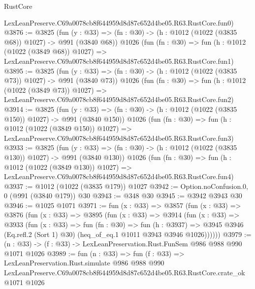 \begin{lexlean}{RustCore}
\begin{coremodule}
    LexLeanPreserve.C69a0078cb8f644959d8d87c652d4be05.R63.RustCore.fun0)
@3876 := @3825
    (fun (y : @33) => (fn : @30) -> (h : @1012 (@1022 (@3835 @68)) @1027) -> @991 (@3840 @68))
    @1026
    (fun (fn : @30) =>
    fun (h : @1012 (@1022 (@3849 @68)) @1027) =>
    LexLeanPreserve.C69a0078cb8f644959d8d87c652d4be05.R63.RustCore.fun1)
@3895 := @3825
    (fun (y : @33) => (fn : @30) -> (h : @1012 (@1022 (@3835 @73)) @1027) -> @991 (@3840 @73))
    @1026
    (fun (fn : @30) =>
    fun (h : @1012 (@1022 (@3849 @73)) @1027) =>
    LexLeanPreserve.C69a0078cb8f644959d8d87c652d4be05.R63.RustCore.fun2)
@3914 := @3825
    (fun (y : @33) => (fn : @30) -> (h : @1012 (@1022 (@3835 @150)) @1027) -> @991 (@3840 @150))
    @1026
    (fun (fn : @30) =>
    fun (h : @1012 (@1022 (@3849 @150)) @1027) =>
    LexLeanPreserve.C69a0078cb8f644959d8d87c652d4be05.R63.RustCore.fun3)
@3933 := @3825
    (fun (y : @33) => (fn : @30) -> (h : @1012 (@1022 (@3835 @130)) @1027) -> @991 (@3840 @130))
    @1026
    (fun (fn : @30) =>
    fun (h : @1012 (@1022 (@3849 @130)) @1027) =>
    LexLeanPreserve.C69a0078cb8f644959d8d87c652d4be05.R63.RustCore.fun4)
@3937 := @1012 (@1022 (@3835 @179)) @1027
@3942 := Option.noConfusion.{0, 0} (@991 (@3840 @179)) @30
@3943 := @348 @30
@3945 := @3942 @3943 @30
@3946 := @1025 @1071
@3971 := fun (x : @33) =>
  @3857
    (fun (x : @33) =>
    @3876
      (fun (x : @33) =>
      @3895
        (fun (x : @33) =>
        @3914
          (fun (x : @33) =>
          @3933
            (fun (x : @33) =>
            fun (fn : @30) =>
            fun (h : @3937) =>
            @3945 @3946 (Eq.refl.{2} (Sort 1) @30) (heq_of_eq.{1} @1011 @3943 @3946 @1026))))))
@3979 := (n : @33) -> (f : @33) -> LexLeanPreservation.Rust.FunSem @986 @988 @990 @1071 @1026
@3989 := fun (n : @33) =>
  fun (f : @33) =>
  LexLeanPreservation.Rust.simulate
    @986
    @988
    @990
    LexLeanPreserve.C69a0078cb8f644959d8d87c652d4be05.R63.RustCore.crate_ok
    @1071
    @1026
\end{coremodule}
\end{lexlean}
